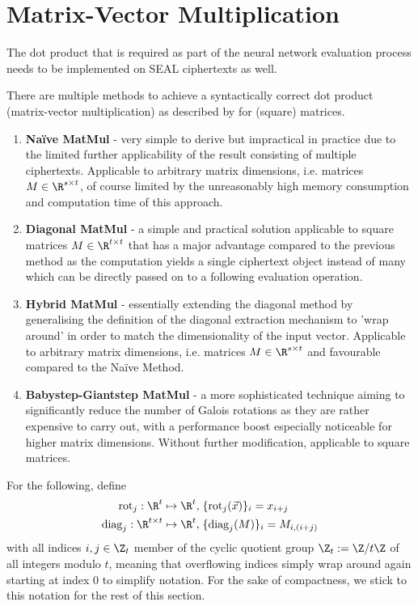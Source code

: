 \section{Matrix-Vector Multiplication}
The dot product that is required as part of the neural network evaluation process needs to be implemented on SEAL ciphertexts as well.

There are multiple methods to achieve a syntactically correct dot product (matrix-vector multiplication) as described by \textcite{2018-gazelle} for (square) matrices.

\begin{enumerate}
  \item \textbf{Naïve MatMul} - very simple to derive but impractical in practice due to the limited further
        applicability of the result consisting of multiple ciphertexts. Applicable to arbitrary matrix dimensions,
        i.e. matrices $M \in \R^{s \times t}$, of course limited by the unreasonably high memory consumption
        and computation time of this approach.
  \item \textbf{Diagonal MatMul} - a simple and practical solution applicable to square matrices $M \in \R^{t \times t}$
        that has a major advantage compared to the previous method as the computation yields a
        single ciphertext object instead of many which can be directly passed on to a following evaluation operation.
  \item \textbf{Hybrid MatMul} - essentially extending the diagonal method by generalising the definition of the
        diagonal extraction mechanism to 'wrap around' in order to match the dimensionality of the input vector.
        Applicable to arbitrary matrix dimensions, i.e. matrices $M \in \R^{s \times t}$ and favourable compared
        to the Naïve Method.
  \item \textbf{Babystep-Giantstep MatMul} - a more sophisticated technique aiming to significantly reduce the number of
        Galois rotations as they are rather expensive to carry out,
        with a performance boost especially noticeable for higher matrix dimensions.
        Without further modification, applicable to square matrices.
\end{enumerate}

For the following, define
\newcommand{\rot}{\mathrm{rot}}
\newcommand{\diag}{\mathrm{diag}}
\begin{align}
  \rot_j: \R^t \mapsto \R^t,             & \; \{\rot_j(\vec{x})\}_i = x_{i + j} \label{eq:rot-definition} \\
  \diag_j: \R^{t \times t} \mapsto \R^t, & \; \{\diag_j(M)\}_i = M_{i, (i+j)} \label{eq:diag-definition}
\end{align}
with all indices $i, j \in \Z_t$ member of the cyclic quotient group $\Z_t := \Z / t \Z$ of all integers modulo $t$, meaning that overflowing indices simply wrap around again starting at index $0$ to simplify notation.
For the sake of compactness, we stick to this notation for the rest of this section.

